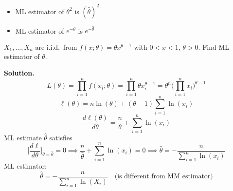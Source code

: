 \begin{Remark}{}{}
    \begin{itemize}
        \item ML estimator of $ \theta^2 $ is $ (\hat{\theta})^2 $
        \item ML estimator of $ e^{-\theta} $ is $ e^{-\hat{\theta}} $
    \end{itemize}
\end{Remark}
\begin{Example}{}{}
    $ X_1,\ldots,X_n $ are i.i.d.\ from $ f(x;\theta)=\theta x^{\theta-1} $
    with $ 0<x<1 $, $ \theta>0 $.
    Find ML estimator of $ \theta $.

    \textbf{Solution.}
    \[ L(\theta)=\prod_{i=1}^n f(x_i;\theta)=
        \prod_{i=1}^n \theta x_i^{\theta-1}=\theta^n\biggl(\prod_{i=1}^n x_i \biggr)^{\!\theta-1} \]
    \[ \ell(\theta)=n\ln(\theta)+(\theta-1)\sum_{i=1}^{n} \ln(x_i) \]
    \[ \frac{d\ell(\theta)}{d\theta}=\frac{n}{\theta} +\sum_{i=1}^{n} \ln(x_i)  \]
    ML estimate $ \hat{\theta} $ satisfies
    \[ \biggl[\frac{d\ell}{d\theta}\biggr]_{\theta=\hat{\theta}}=0\implies
        \frac{n}{\hat{\theta}} +\sum_{i=1}^{n} \ln(x_i)=0
        \implies \hat{\theta}=-\frac{n}{\sum_{i=1}^{n} \ln(x_i)}  \]
    ML estimator:
    \[ \hat{\theta}=-\frac{n}{\sum_{i=1}^{n} \ln(X_i)}\quad\text{(is different from MM estimator)} \]
\end{Example}
